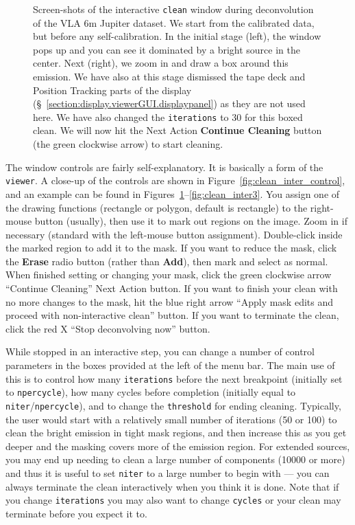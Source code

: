 \begin{figure}[h!]
\begin{center}
\caption{\label{fig:clean_inter1} Screen-shots of the interactive 
{\tt clean} window during deconvolution of the VLA 6m Jupiter
dataset.  We start from the calibrated data, but before any 
self-calibration. In the initial stage (left), the window pops up 
and you can see it dominated by a bright source in the center.
Next (right), we zoom in and draw a box around this emission.
We have also at this stage dismissed the tape deck and Position
Tracking parts of the display 
(\S~\ref{section:display.viewerGUI.displaypanel}) 
as they are not used here.  We have also changed the 
{\tt iterations} to 30 for this boxed clean.
We will now hit the Next Action {\bf Continue Cleaning} button 
(the green clockwise arrow) to start cleaning. } 
\hrulefill
\end{center}
\end{figure}

The window controls are fairly self-explanatory.  It is basically a
form of the {\tt viewer}.  A close-up of the controls are shown in
Figure~\ref{fig:clean_inter_control}, and an example can be found in 
Figures~\ref{fig:clean_inter1}--\ref{fig:clean_inter3}.  
You assign one of the drawing functions
(rectangle or polygon, default is rectangle) to the right-mouse button
(usually), then use it to mark out regions on the image.  Zoom in if
necessary (standard with the left-mouse button assignment).
Double-click inside the marked region to add it to the mask.  If you
want to reduce the mask, click the {\bf Erase} radio button (rather
than {\bf Add}), then mark and select as normal.  
When finished setting or changing your mask, click the green
clockwise arrow ``Continue Cleaning'' Next Action button.  
If you want to finish your clean with
no more changes to the mask, hit the blue right arrow 
``Apply mask edits and proceed with non-interactive clean''
button.  If you want to terminate the clean, click the red X
``Stop deconvolving now'' button.

While stopped in an interactive step, you can change a number of
control parameters in the boxes provided at the left of the menu
bar.  The main use of this is
to control how many {\tt iterations} before the next breakpoint
(initially set to {\tt npercycle}), how many cycles before completion
(initially equal to {\tt niter}/{\tt npercycle}), and to
change the {\tt threshold} for ending cleaning.  
Typically, the user would start
with a relatively small number of iterations (50 or 100) to clean the
bright emission in tight mask regions, and then increase this as you
get deeper and the masking covers more of the emission region.  For
extended sources, you may end up needing to clean a large number
of components (10000 or more) and thus it is useful to set {\tt niter}
to a large number to begin with --- you can always terminate the 
clean interactively when you think it is done.  Note that if you
change {\tt iterations} you may also want to change {\tt cycles} or
your clean may terminate before you expect it to.

